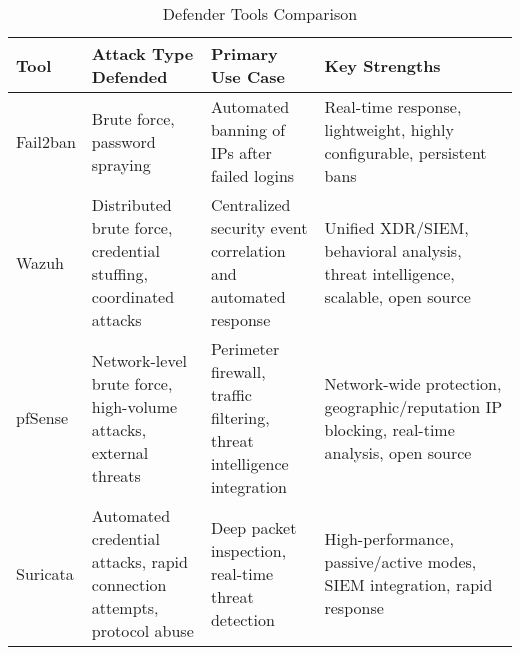 \begin{table}[h!]
\centering
\footnotesize
\begin{tabularx}{\textwidth}{|>{\raggedright\arraybackslash}X|>{\raggedright\arraybackslash}X|>{\raggedright\arraybackslash}X|>{\raggedright\arraybackslash}X|}
\hline
\textbf{Tool} & \textbf{Attack Type Defended} & \textbf{Primary Use Case} & \textbf{Key Strengths} \\
\hline
Fail2ban & Brute force, password spraying & Automated banning of IPs after failed logins & Real-time response, lightweight, highly configurable, persistent bans \\
\hline
Wazuh & Distributed brute force, credential stuffing, coordinated attacks & Centralized security event correlation and automated response & Unified XDR/SIEM, behavioral analysis, threat intelligence, scalable, open source \\
\hline
pfSense & Network-level brute force, high-volume attacks, external threats & Perimeter firewall, traffic filtering, threat intelligence integration & Network-wide protection, geographic/reputation IP blocking, real-time analysis, open source \\
\hline
Suricata & Automated credential attacks, rapid connection attempts, protocol abuse & Deep packet inspection, real-time threat detection & High-performance, passive/active modes, SIEM integration, rapid response \\
\hline
\end{tabularx}
\caption{Defender Tools Comparison}
\label{tab:envtools}
\end{table}
